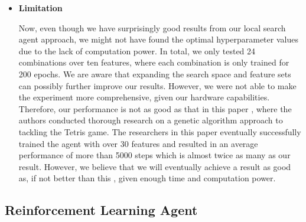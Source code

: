 \documentclass[letterpaper]{article} %
\begin{document}
\begin{itemize}
\item \textbf{Limitation}

  Now, even though we have surprisingly good results from our local search agent approach, we might not have found the optimal hyperparameter values due to the lack of computation power. In total, we only tested 24 combinations over ten features, where each combination is only trained for 200 epochs. We are aware that expanding the search space and feature sets can possibly further improve our results. However, we were not able to make the experiment more comprehensive, given our hardware capabilities. Therefore, our performance is not as good as that in this paper \cite{8247067}, where the authors conducted thorough research on a genetic algorithm approach to tackling the Tetris game. The researchers in this paper eventually successfully trained the agent with over 30 features and resulted in an average performance of more than 5000 steps which is almost twice as many as our result. However, we believe that we will eventually achieve a result as good as, if not better than this \cite{8247067}, given enough time and computation power.
\end{itemize}

\subsection{Reinforcement Learning Agent}
\end{document}
